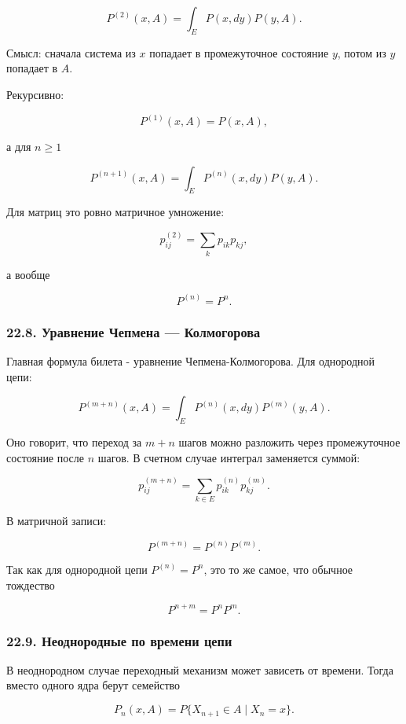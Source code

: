 \documentclass[
  11pt,
  a4paper,
]{article}
\begin{document}
\[
P^{(2)}(x,A)
=
\int_E P(x,dy)P(y,A).
\]

Смысл: сначала система из \(x\) попадает в промежуточное состояние
\(y\), потом из \(y\) попадает в \(A\).

Рекурсивно:

\[
P^{(1)}(x,A)=P(x,A),
\]

а для \(n\ge1\)

\[
P^{(n+1)}(x,A)
=
\int_E P^{(n)}(x,dy)P(y,A).
\]

Для матриц это ровно матричное умножение:

\[
p_{ij}^{(2)}
=
\sum_k p_{ik}p_{kj},
\]

а вообще

\[
P^{(n)}=P^n.
\]

\subsubsection{22.8. Уравнение Чепмена ---
Колмогорова}\label{ux443ux440ux430ux432ux43dux435ux43dux438ux435-ux447ux435ux43fux43cux435ux43dux430-ux43aux43eux43bux43cux43eux433ux43eux440ux43eux432ux430}

Главная формула билета - уравнение Чепмена-Колмогорова. Для однородной
цепи:

\[
P^{(m+n)}(x,A)
=
\int_E P^{(n)}(x,dy)P^{(m)}(y,A).
\]

Оно говорит, что переход за \(m+n\) шагов можно разложить через
промежуточное состояние после \(n\) шагов. В счетном случае интеграл
заменяется суммой:

\[
p_{ij}^{(m+n)}
=
\sum_{k\in E}p_{ik}^{(n)}p_{kj}^{(m)}.
\]

В матричной записи:

\[
P^{(m+n)}=P^{(n)}P^{(m)}.
\]

Так как для однородной цепи \(P^{(n)}=P^n\), это то же самое, что
обычное тождество

\[
P^{n+m}=P^nP^m.
\]

\subsubsection{22.9. Неоднородные по времени
цепи}\label{ux43dux435ux43eux434ux43dux43eux440ux43eux434ux43dux44bux435-ux43fux43e-ux432ux440ux435ux43cux435ux43dux438-ux446ux435ux43fux438}

В неоднородном случае переходный механизм может зависеть от времени.
Тогда вместо одного ядра берут семейство

\[
P_n(x,A)=P\{X_{n+1}\in A\mid X_n=x\}.
\]
\end{document}
